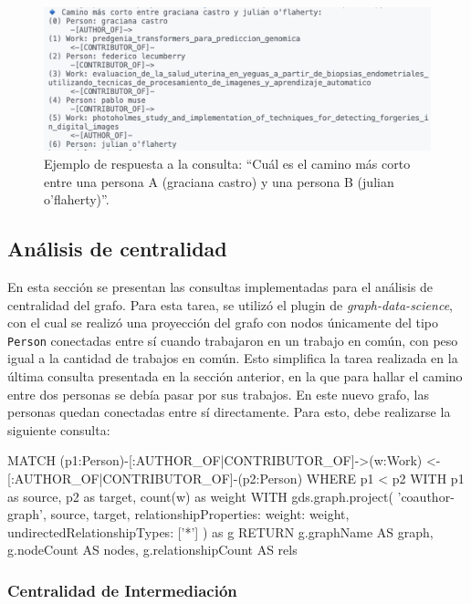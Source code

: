 \documentclass[journal]{IEEEtran}
\begin{document}
\begin{figure}[htb]
	\centering
	\includegraphics[width=\linewidth]{imagenes/camino_corto.png}
	\caption{Ejemplo de respuesta a la consulta: ``Cuál es el camino más corto entre una persona A (graciana castro) y una persona B (julian o'flaherty)''.}
	\label{fig:camino_corto}
\end{figure}

\subsection{Análisis de centralidad}
En esta sección se presentan las consultas implementadas para el análisis de centralidad del grafo. Para esta tarea, se utilizó el plugin de \textit{graph-data-science}, con el cual se realizó una proyección del grafo con nodos únicamente del tipo \texttt{Person} conectadas entre sí cuando trabajaron en un trabajo en común, con peso igual a la cantidad de trabajos en común.
Esto simplifica la tarea realizada en la última consulta presentada en la sección anterior, en la que para hallar el camino entre dos personas se debía pasar por sus trabajos. En este nuevo grafo, las personas quedan conectadas entre sí directamente. Para esto, debe realizarse la siguiente consulta:

\begin{sflisting}[style=sparql,caption= Consulta para obtener la proyección del grafo de personas,label=subgrafo]
	MATCH (p1:Person)-[:AUTHOR_OF|CONTRIBUTOR_OF]->(w:Work)
	<-[:AUTHOR_OF|CONTRIBUTOR_OF]-(p2:Person)
	WHERE p1 < p2
	WITH p1 as source, p2 as target, count(w) as weight
	WITH gds.graph.project(
		'coauthor-graph',
		source,
		target,
		{relationshipProperties: {weight: weight}},
		{undirectedRelationshipTypes: ['*']}
	) as g
	RETURN g.graphName AS graph, g.nodeCount
	AS nodes, g.relationshipCount AS rels
\end{sflisting}

\subsubsection{Centralidad de Intermediación}
\end{document}
